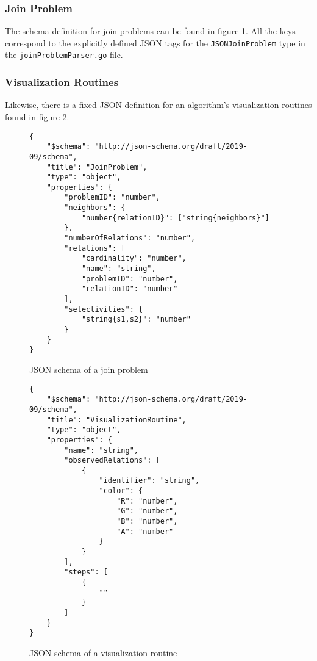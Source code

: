 \subsubsection{Join Problem}
\label{subsub:join-problem-data-structure}

The schema definition for join problems can be found in figure \ref{fig:json-joinproblem}.
All the keys correspond to the explicitly defined JSON tags for the \texttt{JSONJoinProblem} type in the \texttt{joinProblemParser.go} file.

\subsubsection{Visualization Routines}
Likewise, there is a fixed JSON definition for an algorithm's visualization routines found in figure \ref{fig:json-visualization-routine}.

\newpage

\begin{figure}[H]
\begin{verbatim}
{
    "$schema": "http://json-schema.org/draft/2019-09/schema",
    "title": "JoinProblem",
    "type": "object",
    "properties": {
        "problemID": "number",
        "neighbors": {
            "number{relationID}": ["string{neighbors}"]
        },
        "numberOfRelations": "number",
        "relations": [
            "cardinality": "number",
            "name": "string",
            "problemID": "number",
            "relationID": "number"
        ],
        "selectivities": {
            "string{s1,s2}": "number"
        }
    }
}
\end{verbatim}
\caption{JSON schema of a join problem}
\label{fig:json-joinproblem}
\end{figure}

\newpage

\begin{figure}[H]
    \begin{verbatim}
{
    "$schema": "http://json-schema.org/draft/2019-09/schema",
    "title": "VisualizationRoutine",
    "type": "object",
    "properties": {
        "name": "string",
        "observedRelations": [
            {
                "identifier": "string",
                "color": {
                    "R": "number",
                    "G": "number",
                    "B": "number",
                    "A": "number"
                }
            }
        ],
        "steps": [
            {
                ""
            }
        ]
    }
}
\end{verbatim}
\caption{JSON schema of a visualization routine}
\label{fig:json-visualization-routine}
\end{figure}

